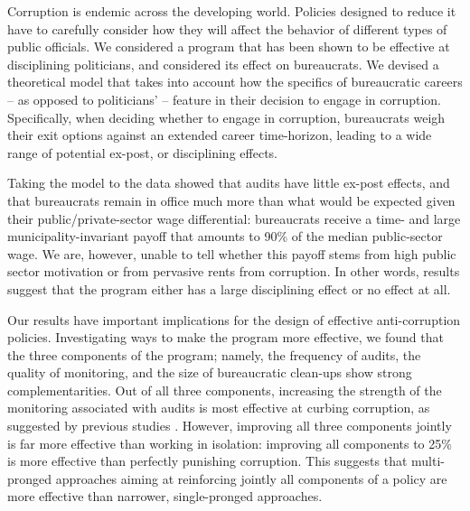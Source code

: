 {Corruption is endemic across the developing world. Policies designed to reduce it have to carefully consider how they will affect the behavior of different types of public officials. We considered a program that has been shown to be effective at disciplining politicians, and considered its effect on bureaucrats. We devised a theoretical model that takes into account how the specifics of bureaucratic careers -- as opposed to politicians' -- feature in their decision to engage in corruption. Specifically, when deciding whether to engage in corruption, bureaucrats weigh their exit options against an extended career time-horizon, leading to a wide range of potential ex-post, or disciplining effects. 

Taking the model to the data showed that audits have little ex-post effects, and that bureaucrats remain in office much more than what would be expected given their public/private-sector wage differential: bureaucrats receive a time- and large municipality-invariant payoff that amounts to 90\% of the median public-sector wage. We are, however, unable to tell whether this payoff stems from high public sector motivation or from pervasive rents from corruption. In other words, results suggest that the program either has a large disciplining effect or no effect at all. 

Our results have important implications for the design of effective anti-corruption policies. Investigating ways to make the program more effective, we found that the three components of the program; namely, the frequency of audits, the quality of monitoring, and the size of bureaucratic clean-ups show strong complementarities. Out of all three components, increasing the strength of the monitoring associated with audits is most effective at curbing corruption, as suggested by previous studies \citep{olken_monitoring_2007,bobonis2016,zamboni_audit_2018}. However, improving all three components jointly is far more effective than working in isolation: improving all components to 25\% is more effective than perfectly punishing corruption. This suggests that multi-pronged approaches aiming at reinforcing jointly all components of a policy are more effective than narrower, single-pronged approaches. 

}
